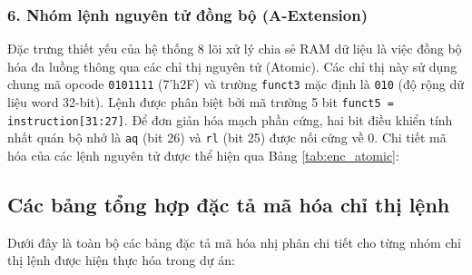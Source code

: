\subsubsection{6. Nhóm lệnh nguyên tử đồng bộ (A-Extension)}
Đặc trưng thiết yếu của hệ thống 8 lõi xử lý chia sẻ RAM dữ liệu là việc đồng bộ hóa đa luồng thông qua các chỉ thị nguyên tử (Atomic). Các chỉ thị này sử dụng chung mã opcode \texttt{0101111} (7'h2F) và trường \texttt{funct3} mặc định là \texttt{010} (độ rộng dữ liệu word 32-bit). Lệnh được phân biệt bởi mã trường 5 bit \texttt{funct5 = instruction[31:27]}. Để đơn giản hóa mạch phần cứng, hai bit điều khiển tính nhất quán bộ nhớ là \texttt{aq} (bit 26) và \texttt{rl} (bit 25) được nối cứng về 0. Chi tiết mã hóa của các lệnh nguyên tử được thể hiện qua Bảng \ref{tab:enc_atomic}:

\subsection{Các bảng tổng hợp đặc tả mã hóa chỉ thị lệnh}
Dưới đây là toàn bộ các bảng đặc tả mã hóa nhị phân chi tiết cho từng nhóm chỉ thị lệnh được hiện thực hóa trong dự án:

